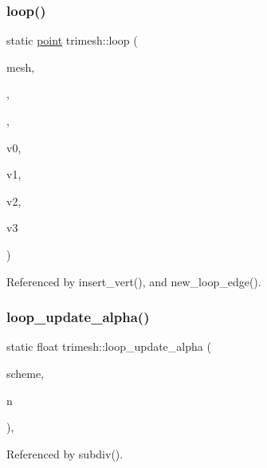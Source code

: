 \mbox{\label{namespacetrimesh_a036483075edee8dfcd56bc4828719a3c}} 
\subsubsection{\texorpdfstring{loop()}{loop()}}
{\footnotesize\ttfamily static \hyperlink{namespacetrimesh_a325b99fd6454b22fa4c4bc3223271b2c}{point} trimesh\+::loop (\begin{DoxyParamCaption}\item[{\hyperlink{classtrimesh_1_1TriMesh}{Tri\+Mesh} $\ast$}]{mesh,  }\item[{int}]{,  }\item[{int}]{,  }\item[{int}]{v0,  }\item[{int}]{v1,  }\item[{int}]{v2,  }\item[{int}]{v3 }\end{DoxyParamCaption})\hspace{0.3cm}{\ttfamily [static]}}



Referenced by insert\+\_\+vert(), and new\+\_\+loop\+\_\+edge().

\mbox{\label{namespacetrimesh_abe10e85ee62d84c8304305153d63652a}} 
\subsubsection{\texorpdfstring{loop\+\_\+update\+\_\+alpha()}{loop\_update\_alpha()}}
{\footnotesize\ttfamily static float trimesh\+::loop\+\_\+update\+\_\+alpha (\begin{DoxyParamCaption}\item[{\hyperlink{namespacetrimesh_a3480f7a1d4d92b412ded9f7cfb1450bd}{Subdiv\+Scheme}}]{scheme,  }\item[{int}]{n }\end{DoxyParamCaption})\hspace{0.3cm}{\ttfamily [inline]}, {\ttfamily [static]}}



Referenced by subdiv().

\mbox{\label{namespacetrimesh_a734b8aaf05955cb2320df40a88136886}} 

